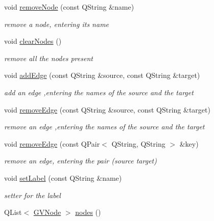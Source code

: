 \begin{DoxyCompactItemize}
void \hyperlink{class_g_v_sub_graph_ac97b366dadeeb5ac8999ee6b22dd7dd4}{remove\-Node} (const \-Q\-String \&name)
\begin{DoxyCompactList}\small\item\em remove a node, entering its name \end{DoxyCompactList}\item 
\hypertarget{class_g_v_sub_graph_a57609be587187f492288d224216b3b14}{void \hyperlink{class_g_v_sub_graph_a57609be587187f492288d224216b3b14}{clear\-Nodes} ()}\label{class_g_v_sub_graph_a57609be587187f492288d224216b3b14}

\begin{DoxyCompactList}\small\item\em remove all the nodes present \end{DoxyCompactList}\item 
void \hyperlink{class_g_v_sub_graph_a84df91480a9e3c7ec38658b475e13d90}{add\-Edge} (const \-Q\-String \&source, const \-Q\-String \&target)
\begin{DoxyCompactList}\small\item\em add an edge ,entering the names of the source and the target \end{DoxyCompactList}\item 
void \hyperlink{class_g_v_sub_graph_adeec195e6301f14864ad3cf4ecb2a7e6}{remove\-Edge} (const \-Q\-String \&source, const \-Q\-String \&target)
\begin{DoxyCompactList}\small\item\em remove an edge ,entering the names of the source and the target \end{DoxyCompactList}\item 
void \hyperlink{class_g_v_sub_graph_a42c2d7c92a223e40364c13fdb1cc46e8}{remove\-Edge} (const \-Q\-Pair$<$ \-Q\-String, \-Q\-String $>$ \&key)
\begin{DoxyCompactList}\small\item\em remove an edge, entering the pair (source target) \end{DoxyCompactList}\item 
void \hyperlink{class_g_v_sub_graph_a14a5e0a85c54220e4908e2692576e62b}{set\-Label} (const \-Q\-String \&name)
\begin{DoxyCompactList}\small\item\em setter for the label \end{DoxyCompactList}\item 
\hypertarget{class_g_v_sub_graph_a777c2146e514db2ccded4b3f77993155}{\-Q\-List$<$ \hyperlink{struct_g_v_node}{\-G\-V\-Node} $>$ \hyperlink{class_g_v_sub_graph_a777c2146e514db2ccded4b3f77993155}{nodes} ()}\label{class_g_v_sub_graph_a777c2146e514db2ccded4b3f77993155}


\end{DoxyCompactItemize}

